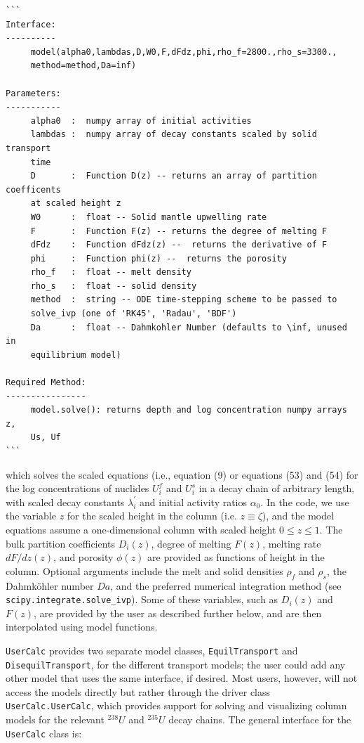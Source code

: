 \documentclass[draft]{agujournal2019}
\begin{document}
\sffamily
\color{purple}
\begin{verbatim}
```
Interface:
----------
     model(alpha0,lambdas,D,W0,F,dFdz,phi,rho_f=2800.,rho_s=3300.,
     method=method,Da=inf)

Parameters:
-----------
     alpha0  :  numpy array of initial activities
     lambdas :  numpy array of decay constants scaled by solid transport 
     time
     D       :  Function D(z) -- returns an array of partition coefficents 
     at scaled height z
     W0      :  float -- Solid mantle upwelling rate
     F       :  Function F(z) -- returns the degree of melting F
     dFdz    :  Function dFdz(z) --  returns the derivative of F
     phi     :  Function phi(z) --  returns the porosity
     rho_f   :  float -- melt density
     rho_s   :  float -- solid density
     method  :  string -- ODE time-stepping scheme to be passed to 
     solve_ivp (one of 'RK45', 'Radau', 'BDF')
     Da      :  float -- Dahmkohler Number (defaults to \inf, unused in 
     equilibrium model)

Required Method:
----------------
     model.solve(): returns depth and log concentration numpy arrays  z, 
     Us, Uf
```
\end{verbatim}

\color{black}
\normalfont
which solves the scaled equations (i.e., equation (9) or equations (53) and (54) for the log concentrations of nuclides $U_i^f$ and $U_i^s$ in a decay chain of arbitrary length, with scaled decay constants $\lambda^\prime_i$ and initial activity ratios $\alpha_0$. In the code, we use the variable $z$ for the scaled height in the column (i.e. $z\equiv \zeta$), and the model equations assume a one-dimensional column with scaled height $0 \leq z \leq 1$. The bulk partition coefficients $D_i(z)$, degree of melting $F(z)$, melting rate $dF/dz(z)$, and porosity $\phi(z)$ are provided as functions of height in the column. Optional arguments include the melt and solid densities $\rho_f$ and $\rho_s$, the Dahmköhler number $Da$, and the preferred numerical integration method (see \colorbox{gray!20}{\texttt{scipy.integrate.solve\_ivp}}). Some of these variables, such as $D_i(z)$ and $F(z)$, are provided by the user as described further below, and are then interpolated using model functions.

\colorbox{gray!20}{\texttt{UserCalc}} provides two separate model classes, \colorbox{gray!20}{\texttt{EquilTransport}} and \colorbox{gray!20}{\texttt{DisequilTransport}}, for the different transport models; the user could add any other model that uses the same interface, if desired. Most users, however, will not access the models directly but rather through the driver class \colorbox{gray!20}{\texttt{UserCalc.UserCalc}}, which provides support for solving and visualizing column models for the relevant $^{238}U$ and $^{235}U$ decay chains. The general interface for the \colorbox{gray!20}{\texttt{UserCalc}} class is:
\end{document}
